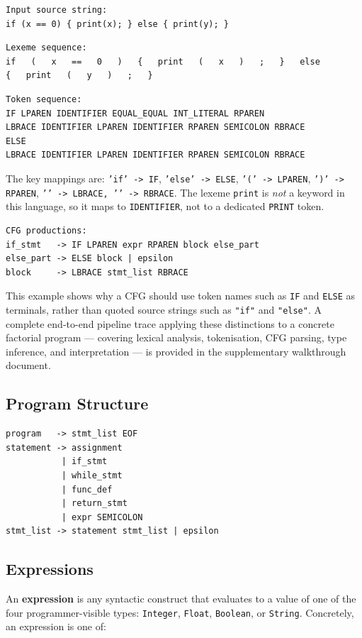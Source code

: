\begin{lstlisting}
Input source string:
if (x == 0) { print(x); } else { print(y); }
\end{lstlisting}

\begin{lstlisting}
Lexeme sequence:
if   (   x   ==   0   )   {   print   (   x   )   ;   }   else
{   print   (   y   )   ;   }
\end{lstlisting}

\begin{lstlisting}
Token sequence:
IF LPAREN IDENTIFIER EQUAL_EQUAL INT_LITERAL RPAREN
LBRACE IDENTIFIER LPAREN IDENTIFIER RPAREN SEMICOLON RBRACE
ELSE
LBRACE IDENTIFIER LPAREN IDENTIFIER RPAREN SEMICOLON RBRACE
\end{lstlisting}

\noindent The key mappings are:
\texttt{'if' -> IF},
\texttt{'else' -> ELSE},
\texttt{'(' -> LPAREN},
\texttt{')' -> RPAREN},
\texttt{'{' -> LBRACE},
\texttt{'}' -> RBRACE}.
The lexeme \texttt{print} is \emph{not} a keyword in this language, so it
maps to \texttt{IDENTIFIER}, not to a dedicated \texttt{PRINT} token.

\begin{lstlisting}
CFG productions:
if_stmt   -> IF LPAREN expr RPAREN block else_part
else_part -> ELSE block | epsilon
block     -> LBRACE stmt_list RBRACE
\end{lstlisting}

\noindent This example shows why a CFG should use token names such as
\texttt{IF} and \texttt{ELSE} as terminals, rather than quoted source strings
such as \texttt{"if"} and \texttt{"else"}.
A complete end-to-end pipeline trace applying these distinctions to a
concrete factorial program --- covering lexical analysis, tokenisation,
CFG parsing, type inference, and interpretation --- is provided in the
supplementary walkthrough document.

\subsection{Program Structure}
\begin{lstlisting}
program   -> stmt_list EOF
statement -> assignment
           | if_stmt
           | while_stmt
           | func_def
           | return_stmt
           | expr SEMICOLON
stmt_list -> statement stmt_list | epsilon
\end{lstlisting}

\subsection{Expressions}
An \textbf{expression} is any syntactic construct that evaluates to a value of
one of the four programmer-visible types: \texttt{Integer}, \texttt{Float},
\texttt{Boolean}, or \texttt{String}. Concretely, an expression is one of:

